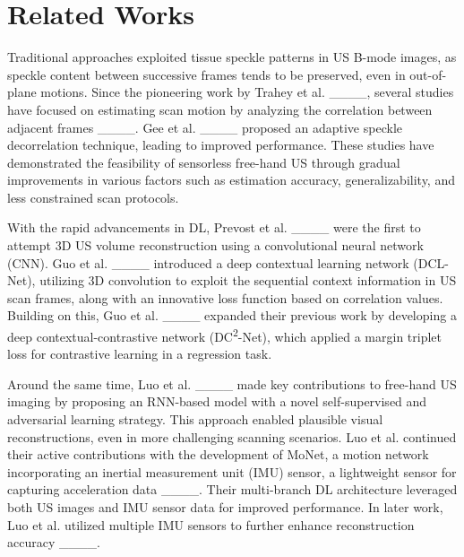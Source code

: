 \section{Related Works}
\label{sec:Related_Works}

Traditional approaches exploited tissue speckle patterns in US B-mode images, 
as speckle content between successive frames tends to be preserved, 
even in out-of-plane  motions. 
Since the pioneering work by Trahey et al. ____, 
several studies have focused on estimating scan motion by analyzing the correlation 
between adjacent frames ____. 
Gee et al. ____ proposed an adaptive speckle decorrelation technique, 
leading to improved performance. 
These studies have demonstrated the feasibility of sensorless free-hand US 
through gradual improvements in various factors such as estimation accuracy, 
generalizability, and less constrained scan protocols.

With the rapid advancements in DL, 
Prevost et al. ____ were the first to attempt 3D US volume reconstruction 
using a convolutional neural network (CNN).
Guo et al. ____ introduced a deep contextual learning network (DCL-Net), 
utilizing 3D convolution to exploit the sequential context information in US scan frames, 
along with an innovative loss function based on correlation values. 
Building on this, Guo et al. ____ expanded their previous work 
by developing a deep contextual-contrastive network (DC\textsuperscript{2}-Net), 
which applied a margin triplet loss for contrastive learning in a regression task.

Around the same time, 
Luo et al. ____ made key contributions to free-hand US imaging 
by proposing an RNN-based model with a novel self-supervised and adversarial learning strategy. 
This approach enabled plausible visual reconstructions, 
even in more challenging scanning scenarios. 
Luo et al. continued their active contributions with the development of MoNet, 
a motion network incorporating an inertial measurement unit (IMU) sensor, 
a lightweight sensor for capturing acceleration data ____. 
Their multi-branch DL architecture leveraged both US images and IMU sensor data for improved performance. 
In later work, Luo et al. utilized multiple IMU sensors to further enhance reconstruction accuracy ____.

